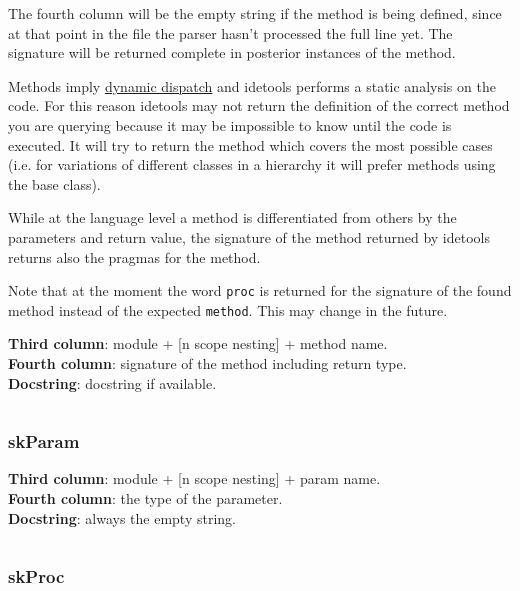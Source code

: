 The fourth column will be the empty string if the method is being
defined, since at that point in the file the parser hasn't processed the
full line yet. The signature will be returned complete in posterior
instances of the method.

Methods imply
\href{tut2.html\#object-oriented-programming-dynamic-dispatch}{dynamic
dispatch} and idetools performs a static analysis on the code. For this
reason idetools may not return the definition of the correct method you
are querying because it may be impossible to know until the code is
executed. It will try to return the method which covers the most
possible cases (i.e. for variations of different classes in a hierarchy
it will prefer methods using the base class).

While at the language level a method is differentiated from others by
the parameters and return value, the signature of the method returned by
idetools returns also the pragmas for the method.

Note that at the moment the word \texttt{proc} is returned for the
signature of the found method instead of the expected \texttt{method}.
This may change in the future.

\textbf{Third column}: module + {[}n scope nesting{]} + method name.\\
\textbf{Fourth column}: signature of the method including return type.\\
\textbf{Docstring}: docstring if available.

\begin{verbatim}
\end{verbatim}

\hypertarget{skparam}{%
\subsubsection{skParam}\label{skparam}}

\textbf{Third column}: module + {[}n scope nesting{]} + param name.\\
\textbf{Fourth column}: the type of the parameter.\\
\textbf{Docstring}: always the empty string.

\begin{verbatim}
\end{verbatim}

\hypertarget{skproc}{%
\subsubsection{skProc}\label{skproc}}

